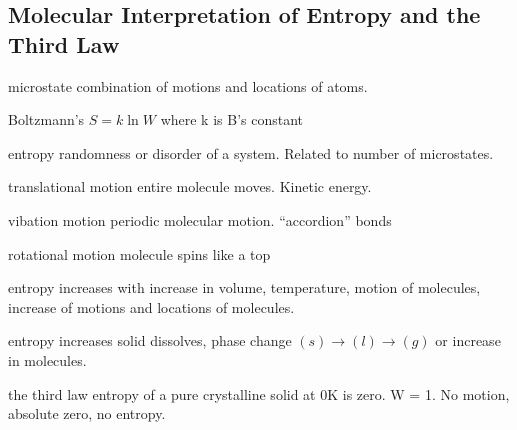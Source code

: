 \begin{mdframed}
\begin{multicols}{2}
\subsection{Molecular Interpretation of Entropy and the Third Law}
\begin{compactdesc}
    \item[microstate] combination of motions and locations of atoms.
    \item[Boltzmann's] $S=k \ln W$ where k is B's constant
    \item[entropy] randomness or disorder of a system. Related to
        number of microstates.
    \item[translational motion] entire molecule moves. Kinetic energy.
    \item[vibation motion] periodic molecular motion. ``accordion'' bonds
    \item[rotational motion] molecule spins like a top
    \item[entropy increases] with increase in volume, temperature, motion of
        molecules, increase of motions and locations of molecules.
    \item[entropy increases] solid dissolves, phase change
        $(s) \to (l) \to (g)$ or increase in molecules.
    \item[the third law] entropy of a pure crystalline solid at 0K is zero. W = 1.
        No motion, absolute zero, no entropy.
\end{compactdesc}
\end{multicols}
\end{mdframed}







